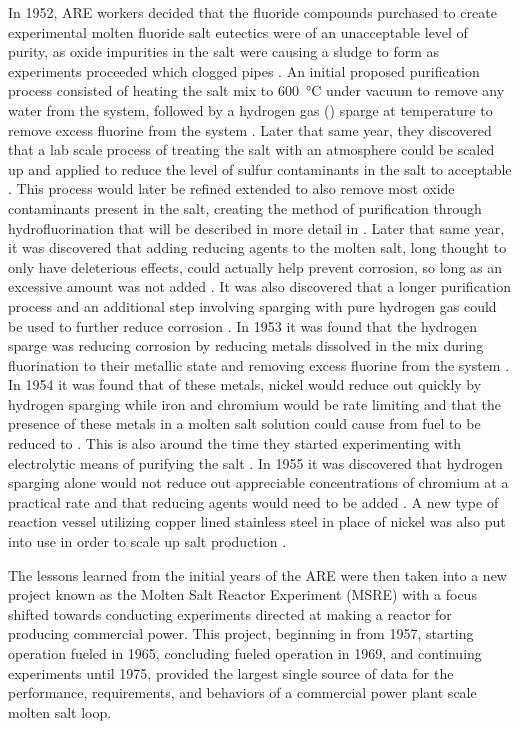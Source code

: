 In 1952, ARE workers decided that the fluoride compounds purchased to
create experimental molten fluoride salt eutectics were of an
unacceptable level of purity, as oxide impurities in the salt were
causing a sludge to form as experiments proceeded which clogged pipes
\cite{rev1}. An initial proposed purification process consisted of heating
the salt mix to \SI{600}{\celsius} under vacuum to remove any water from the
system, followed by a hydrogen gas () sparge at temperature to
remove excess fluorine from the system \cite{rev1}. Later that same year,
they discovered that a lab scale process of treating the salt with an
 atmosphere could be scaled up and applied to reduce the level
of sulfur contaminants in the salt to acceptable \cite{rev2}. This process
would later be refined extended to also remove most oxide
contaminants present in the salt, creating the method of purification
through hydrofluorination that will be described in more detail in
. Later that same year, it was discovered that adding
reducing agents to the molten salt, long thought to only have
deleterious effects, could actually help prevent corrosion, so long
as an excessive amount was not added \cite{rev3}. It was also discovered that
a longer purification process and an additional step involving
sparging with pure hydrogen gas could be used to further reduce
corrosion \cite{rev3}. In 1953 it was found that the hydrogen sparge was
reducing corrosion by reducing metals dissolved in the mix during
fluorination to their metallic state and removing excess fluorine
from the system \cite{rev4}. In 1954 it was found that of these metals,
nickel would reduce out quickly by hydrogen sparging while iron and
chromium would be rate limiting and that the presence of these metals
in a molten salt solution could cause  from fuel to be reduced
to  \cite{rev5}. This is also around the time they started experimenting
with electrolytic means of purifying the salt \cite{rev5}. In 1955 it was
discovered that hydrogen sparging alone would not reduce out
appreciable concentrations of chromium at a practical rate and that
reducing agents would need to be added \cite{rev6}. A new type of reaction
vessel utilizing copper lined stainless steel in place of nickel was
also put into use in order to scale up salt production \cite{rev6}. \par

The lessons learned from the initial years of the ARE were then taken
into a new project known as the Molten Salt Reactor Experiment (MSRE)
with a focus shifted towards conducting experiments directed at
making a reactor for producing commercial power. This project,
beginning in from 1957, starting operation fueled in 1965, concluding
fueled operation in 1969, and continuing experiments until 1975,
provided the largest single source of data for the performance,
requirements, and behaviors of a commercial power plant scale molten salt loop.
\par

